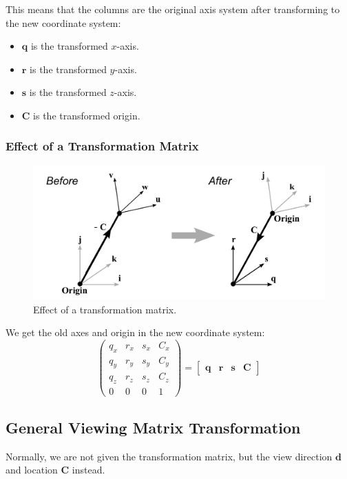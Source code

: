 \documentclass[11pt]{article}
\begin{document}
This means that the columns are the original axis system after transforming to the new coordinate system:
\begin{itemize}
  \item $\bm{q}$ is the transformed $x$-axis.
  \item $\bm{r}$ is the transformed $y$-axis.
  \item $\bm{s}$ is the transformed $z$-axis.
  \item $\bm{C}$ is the transformed origin.
\end{itemize}

\subsubsection{Effect of a Transformation Matrix}
\begin{figure}[htb!]
  \caption{Effect of a transformation matrix.}
  \includegraphics[scale=0.2]{effecttransform}
  \centering
\end{figure}

We get the old axes and origin in the new coordinate system:
\[
  \begin{pmatrix}
    q_x & r_x & s_x & C_x \\
    q_y & r_y & s_y & C_y \\
    q_z & r_z & s_z & C_z \\
    0 & 0 & 0 & 1
  \end{pmatrix}
  =
  \begin{bmatrix} \bm{q} & \bm{r} & \bm{s} & \bm{C} \end{bmatrix}
\]

\subsection{General Viewing Matrix Transformation}
Normally, we are not given the transformation matrix, but the view direction $\bm{d}$ and location $\bm{C}$ instead.
\end{document}
